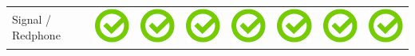 \documentclass[10pt,foldmark,tumble]{leaflet}
\begin{document}
{{\begin{tabular}{ L{2cm} | C{2cm} | C{2cm} | C{2cm} | C{2cm} | C{2cm} | C{2cm} | C{2cm} | }
Signal / Redphone & \includegraphics[scale=0.1]{pics/haken.png} & \includegraphics[scale=0.1]{pics/haken.png} & \includegraphics[scale=0.1]{pics/haken.png} & \includegraphics[scale=0.1]{pics/haken.png} & \includegraphics[scale=0.1]{pics/haken.png} & \includegraphics[scale=0.1]{pics/haken.png} & \includegraphics[scale=0.1]{pics/haken.png} \tabularnewline

\end{tabular}}}
\end{document}
